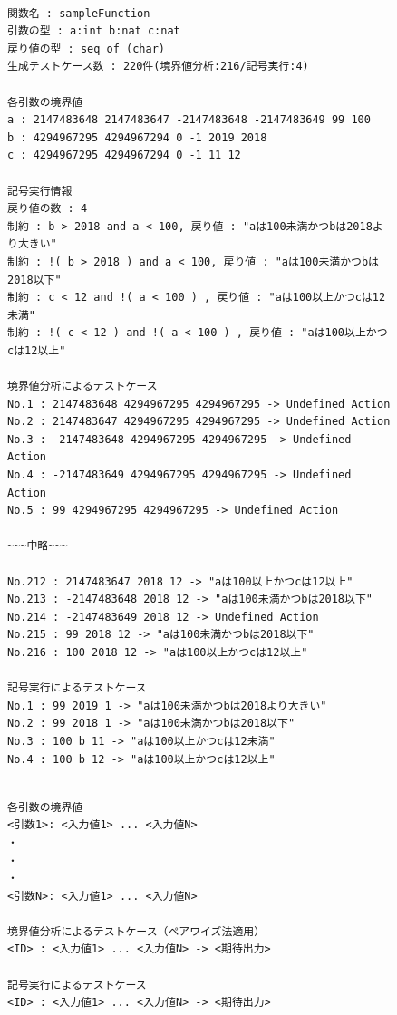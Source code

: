 \documentclass[uplatex, report, a4j, 10pt]{jsbook}
\begin{document}
\lstset{language=}
\begin{figure}[tp]
  \begin{lstlisting}[caption=既存のBWDMのテストケース出力例(コード\ref{fig:input_sample}を適用),label=fig:testcase_sample]

関数名 : sampleFunction
引数の型 : a:int b:nat c:nat 
戻り値の型 : seq of (char)
生成テストケース数 : 220件(境界値分析:216/記号実行:4)

各引数の境界値
a : 2147483648 2147483647 -2147483648 -2147483649 99 100 
b : 4294967295 4294967294 0 -1 2019 2018 
c : 4294967295 4294967294 0 -1 11 12 

記号実行情報
戻り値の数 : 4
制約 : b > 2018 and a < 100, 戻り値 : "aは100未満かつbは2018より大きい"
制約 : !( b > 2018 ) and a < 100, 戻り値 : "aは100未満かつbは2018以下"
制約 : c < 12 and !( a < 100 ) , 戻り値 : "aは100以上かつcは12未満"
制約 : !( c < 12 ) and !( a < 100 ) , 戻り値 : "aは100以上かつcは12以上"

境界値分析によるテストケース
No.1 : 2147483648 4294967295 4294967295 -> Undefined Action
No.2 : 2147483647 4294967295 4294967295 -> Undefined Action
No.3 : -2147483648 4294967295 4294967295 -> Undefined Action
No.4 : -2147483649 4294967295 4294967295 -> Undefined Action
No.5 : 99 4294967295 4294967295 -> Undefined Action

~~~中略~~~

No.212 : 2147483647 2018 12 -> "aは100以上かつcは12以上"
No.213 : -2147483648 2018 12 -> "aは100未満かつbは2018以下"
No.214 : -2147483649 2018 12 -> Undefined Action
No.215 : 99 2018 12 -> "aは100未満かつbは2018以下"
No.216 : 100 2018 12 -> "aは100以上かつcは12以上"

記号実行によるテストケース
No.1 : 99 2019 1 -> "aは100未満かつbは2018より大きい"
No.2 : 99 2018 1 -> "aは100未満かつbは2018以下"
No.3 : 100 b 11 -> "aは100以上かつcは12未満"
No.4 : 100 b 12 -> "aは100以上かつcは12以上"

\end{lstlisting}
\end{figure}

\lstset{language=}
\begin{figure}[tp]
  \begin{lstlisting}[caption=既存のBWDMのテストケースの出力フォーマット,label=fig:bwdm_format]

各引数の境界値
<引数1>: <入力値1> ... <入力値N>
・
・
・
<引数N>: <入力値1> ... <入力値N>

境界値分析によるテストケース（ペアワイズ法適用）
<ID> : <入力値1> ... <入力値N> -> <期待出力>

記号実行によるテストケース
<ID> : <入力値1> ... <入力値N> -> <期待出力>

\end{lstlisting}
\end{figure}
\end{document}
